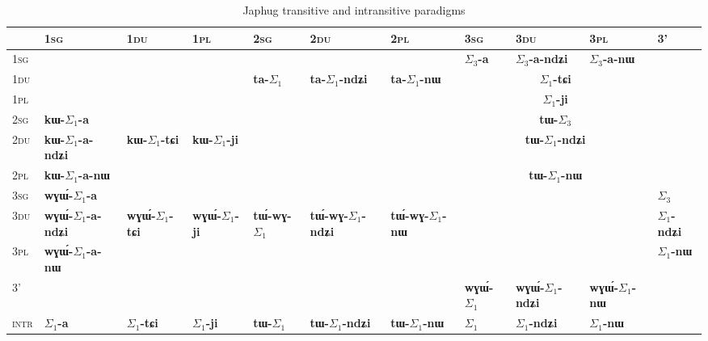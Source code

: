 \documentclass[oneside,a4paper,11pt]{article}
\newcommand{\ipa}[1]{\textbf{\phon\mbox{#1}}} %
\newcommand{\grise}[1]{\cellcolor{lightgray}\textbf{#1}}
\newcommand{\ra}{$\Sigma_1$}
\newcommand{\rc}{$\Sigma_3$}
\begin{document}
\begin{landscape}
\begin{table}[H]
\caption{Japhug transitive and intransitive paradigms}\label{tab:japhug.tr}
\begin{tabular}{l|l|l|l|l|l|l|l|l|l|l|}
\textsc{} & 	\textsc{1sg} & 	  \textsc{1du} & 	\textsc{1pl} & 	\textsc{2sg} & 	\textsc{2du} & 	\textsc{2pl} & 	\textsc{3sg} & 	\textsc{3du} & 	\textsc{3pl} & 	\textsc{3'} \\ 	
\hline
\textsc{1sg} & \multicolumn{3}{c|}{\grise{}} &	\ipa{} & 	\ipa{} & 	\ipa{} & 	\ipa{\rc{}-a}   & 	 \ipa{\rc{}-a-ndʑi} & 	 \ipa{\rc{}-a-nɯ} & 	\grise{} \\	
\cline{8-10}
\textsc{1du} & 	\multicolumn{3}{c|}{\grise{}} &	\ipa{ta-\ra{}} & 	\ipa{ta-\ra{}-ndʑi} & 	\ipa{ta-\ra{}-nɯ} & 	\multicolumn{3}{c|}{ \ipa{\ra{}-tɕi}}  & 	\grise{} \\	
\cline{8-10}
\textsc{1pl} & 	\multicolumn{3}{c|}{\grise{}} & 	  & 	&  & 	\multicolumn{3}{c|}{ \ipa{\ra{}-ji}}  & 	\grise{} \\	
\cline{1-10}
\textsc{2sg} & 	\ipa{kɯ-\ra{}-a} & 	\ipa{} & 	\ipa{} & 	\multicolumn{3}{c|}{\grise{}}&	\multicolumn{3}{c|}{\ipa{tɯ-\rc{}}} & 	\grise{} \\	
\cline{2-2}
\cline{8-10}
\textsc{2du} & 	\ipa{kɯ-\ra{}-a-ndʑi} & 	\ipa{kɯ-\ra{}-tɕi} & 	\ipa{kɯ-\ra{}-ji} & 	\multicolumn{3}{c|}{\grise{}} &	\multicolumn{3}{c|}{\ipa{tɯ-\ra{}-ndʑi}} & 	\grise{} \\	
\cline{2-2}
\cline{8-10}
\textsc{2pl} & 	\ipa{kɯ-\ra{}-a-nɯ} & 	\ipa{} & 	\ipa{} & 	\multicolumn{3}{c|}{\grise{}}&	\multicolumn{3}{c|}{\ipa{tɯ-\ra{}-nɯ}} & 	\grise{} \\	
\hline
\textsc{3sg} &  	\ipa{wɣɯ́-\ra{}-a} & 	\ipa{} & 	\ipa{} & 	\ipa{} & 	\ipa{} & 	\ipa{} & \multicolumn{3}{c|}{\grise{}} &	\ipa{\rc{}} \\ 	
\cline{2-2}
\cline{11-11}
\textsc{3du} &  	\ipa{wɣɯ́-\ra{}-a-ndʑi} & 	 \ipa{wɣɯ́-\ra{}-tɕi} & 		\ipa{wɣɯ́-\ra{}-ji} & 	\ipa{tɯ́-wɣ-\ra{}} & 	\ipa{tɯ́-wɣ-\ra{}-ndʑi} & 	\ipa{tɯ́-wɣ-\ra{}-nɯ} & 	\multicolumn{3}{c|}{\grise{}} &	\ipa{\ra{}-ndʑi} \\ 
\cline{2-2}	
\cline{11-11}
\textsc{3pl} &  	\ipa{wɣɯ́-\ra{}-a-nɯ} & 	\ipa{} & 	\ipa{} & 	\ipa{} & 	\ipa{} & 	\ipa{} & \multicolumn{3}{c|}{\grise{}} &	\ipa{\ra{}-nɯ} \\ 	
\hline
\textsc{3'} & 	\multicolumn{6}{c|}{\grise{}} &	\ipa{wɣɯ́-\ra{}} & 	\ipa{wɣɯ́-\ra{}-ndʑi} & 	\ipa{wɣɯ́-\ra{}-nɯ} & 	\grise{} \\	
	\hline	\hline
\textsc{intr}&\ipa{\ra{}-a}&\ipa{\ra{}-tɕi}&\ipa{\ra{}-ji}&\ipa{tɯ-\ra{}}&\ipa{tɯ-\ra{}-ndʑi}&\ipa{tɯ-\ra{}-nɯ}&\ipa{\ra{}}&\ipa{\ra{}-ndʑi} &\ipa{\ra{}-nɯ}& 	\grise{} \\	
	\hline
\end{tabular}
\end{table}
\end{landscape}
\end{document}
